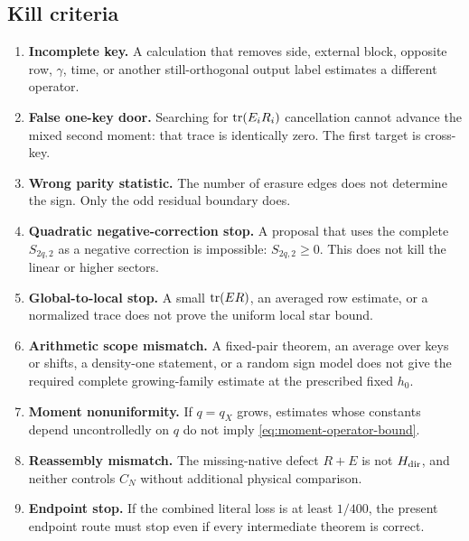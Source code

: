 \subsection{Kill criteria}

\begin{enumerate}[label=\textup{(K\arabic*)},leftmargin=3.5em]
 \item \textbf{Incomplete key.}  A calculation that removes side,
       external block, opposite row, \(\gamma\), time, or another
       still-orthogonal output label estimates a different operator.

 \item \textbf{False one-key door.}  Searching for
       \(\operatorname{tr}(E_iR_i)\) cancellation cannot advance the mixed second moment:
       that trace is identically zero.  The first target is cross-key.

 \item \textbf{Wrong parity statistic.}  The number of erasure edges does
       not determine the sign.  Only the odd residual boundary does.

 \item \textbf{Quadratic negative-correction stop.}  A proposal that uses
       the complete \(S_{2q,2}\) as a negative correction is impossible:
       \(S_{2q,2}\ge0\).  This does not kill the linear or higher sectors.

 \item \textbf{Global-to-local stop.}  A small \(\operatorname{tr}(ER)\), an averaged
       row estimate, or a normalized trace does not prove the uniform local
       star bound.

 \item \textbf{Arithmetic scope mismatch.}  A fixed-pair theorem, an
       average over keys or shifts, a density-one statement, or a random
       sign model does not give the required complete growing-family
       estimate at the prescribed fixed \(h_0\).

 \item \textbf{Moment nonuniformity.}  If \(q=q_X\) grows, estimates whose
       constants depend uncontrolledly on \(q\) do not imply
       \eqref{eq:moment-operator-bound}.

 \item \textbf{Reassembly mismatch.}  The missing-native defect \(R+E\) is
       not \(H_{\rm dir}\), and neither controls \(C_N\) without additional
       physical comparison.

 \item \textbf{Endpoint stop.}  If the combined literal loss is at least
       \(1/400\), the present endpoint route must stop even if every
       intermediate theorem is correct.
\end{enumerate}

